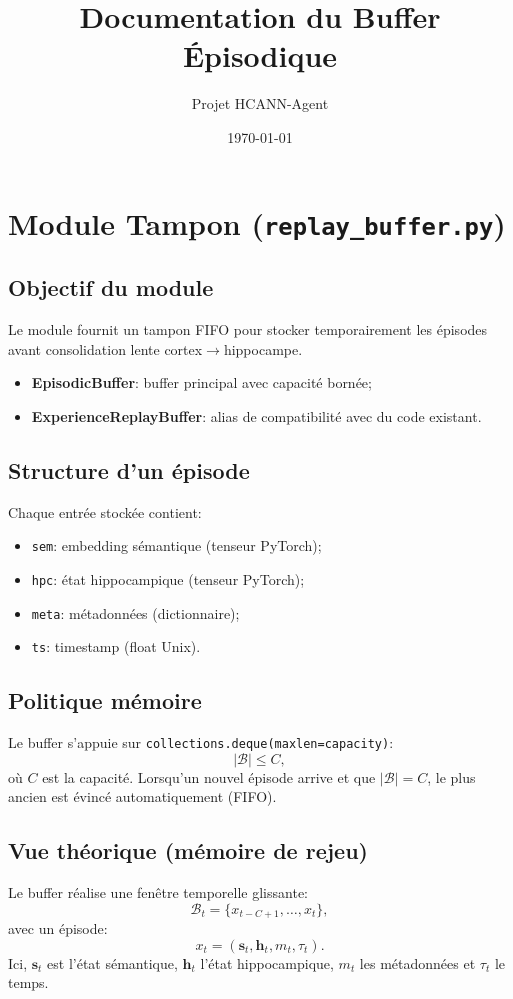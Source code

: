 \documentclass[12pt,a4paper]{article}
\title{Documentation du Buffer Épisodique}
\author{Projet HCANN-Agent}
\date{\today}
\begin{document}
\maketitle

\section{Module Tampon (\texttt{replay\_buffer.py})}

\subsection{Objectif du module}
Le module fournit un tampon FIFO pour stocker temporairement les épisodes avant consolidation lente cortex$\rightarrow$hippocampe.

\begin{itemize}
    \item \textbf{EpisodicBuffer}: buffer principal avec capacité bornée;
    \item \textbf{ExperienceReplayBuffer}: alias de compatibilité avec du code existant.
\end{itemize}

\subsection{Structure d'un épisode}
Chaque entrée stockée contient:
\begin{itemize}
    \item \texttt{sem}: embedding sémantique (tenseur PyTorch);
    \item \texttt{hpc}: état hippocampique (tenseur PyTorch);
    \item \texttt{meta}: métadonnées (dictionnaire);
    \item \texttt{ts}: timestamp (float Unix).
\end{itemize}

\subsection{Politique mémoire}
Le buffer s'appuie sur \texttt{collections.deque(maxlen=capacity)}:
\begin{equation}
|\mathcal{B}| \le C,
\end{equation}
où $C$ est la capacité.  
Lorsqu'un nouvel épisode arrive et que $|\mathcal{B}|=C$, le plus ancien est évincé automatiquement (FIFO).

\subsection{Vue théorique (mémoire de rejeu)}
Le buffer réalise une fenêtre temporelle glissante:
\begin{equation}
\mathcal{B}_t = \{x_{t-C+1}, \dots, x_t\},
\end{equation}
avec un épisode:
\begin{equation}
x_t=(\mathbf{s}_t,\mathbf{h}_t,m_t,\tau_t).
\end{equation}
Ici, $\mathbf{s}_t$ est l'état sémantique, $\mathbf{h}_t$ l'état hippocampique, $m_t$ les métadonnées et $\tau_t$ le temps.
\end{document}
